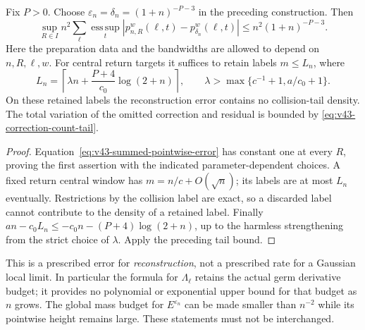 \begin{corollary}
\label{cor:v43-prescribed-reconstruction}
Fix $P>0$. Choose
$\varepsilon_n=\delta_n=(1+n)^{-P-3}$ in the preceding construction.
Then
\begin{equation}\label{eq:v43-reconstruction-rate}
 \sup_{R\in I} n^2\sum_\ell\operatorname*{ess\,sup}_{t}
        |p_{n,R}^w(\ell,t)-p_{\delta_n}^w(\ell,t)|
                  \le n^2(1+n)^{-P-3}.
\end{equation}
Here the preparation data and the bandwidths are allowed to depend
on $n,R,\ell,w$. For central return targets it suffices to retain
labels $m\le L_n$, where
\begin{equation}\label{eq:v43-explicit-count-cutoff}
 L_n=\left\lceil\lambda n+\frac{P+4}{c_0}\log(2+n)\right\rceil,
 \qquad \lambda>\max\{c^{-1}+1,a/c_0+1\}.
\end{equation}
On these retained labels the reconstruction error contains no
collision-tail density. The total variation of the omitted correction
and residual is bounded by \eqref{eq:v43-correction-count-tail}.
\end{corollary}
\begin{proof}
Equation~\eqref{eq:v43-summed-pointwise-error} has constant one at
every $R$, proving the first assertion with the indicated
parameter-dependent choices. A fixed return central window has
$m=n/c+O(\sqrt n)$; its labels are at most $L_n$ eventually.
Restrictions by the collision label are exact, so a discarded label
cannot contribute to the density of a retained label. Finally
$an-c_0L_n\le-c_0n-(P+4)\log(2+n)$, up to the harmless strengthening
from the strict choice of $\lambda$. Apply the preceding tail bound.
\end{proof}

This is a prescribed error for \emph{reconstruction}, not a prescribed
rate for a Gaussian local limit. In particular the formula for
$\Lambda_\ell$ retains the actual germ derivative budget; it provides
no polynomial or exponential upper bound for that budget as $n$
grows. The global mass budget for $E^{\varepsilon_n}$ can be made
smaller than $n^{-2}$ while its pointwise height remains large.
These statements must not be interchanged.

